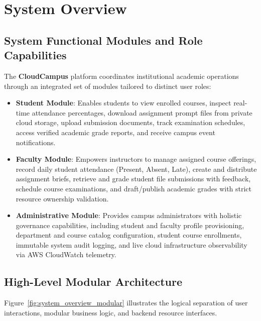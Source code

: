 \newpage
\section{System Overview}

\subsection{System Functional Modules and Role Capabilities}
The \textbf{CloudCampus} platform coordinates institutional academic operations through an integrated set of modules tailored to distinct user roles:

\begin{itemize}[leftmargin=*,itemsep=1pt]
    \item \textbf{Student Module}: Enables students to view enrolled courses, inspect real-time attendance percentages, download assignment prompt files from private cloud storage, upload submission documents, track examination schedules, access verified academic grade reports, and receive campus event notifications.
    \item \textbf{Faculty Module}: Empowers instructors to manage assigned course offerings, record daily student attendance (Present, Absent, Late), create and distribute assignment briefs, retrieve and grade student file submissions with feedback, schedule course examinations, and draft/publish academic grades with strict resource ownership validation.
    \item \textbf{Administrative Module}: Provides campus administrators with holistic governance capabilities, including student and faculty profile provisioning, department and course catalog configuration, student course enrollments, immutable system audit logging, and live cloud infrastructure observability via AWS CloudWatch telemetry.
\end{itemize}

\subsection{High-Level Modular Architecture}
Figure~\ref{fig:system_overview_modular} illustrates the logical separation of user interactions, modular business logic, and backend resource interfaces.


